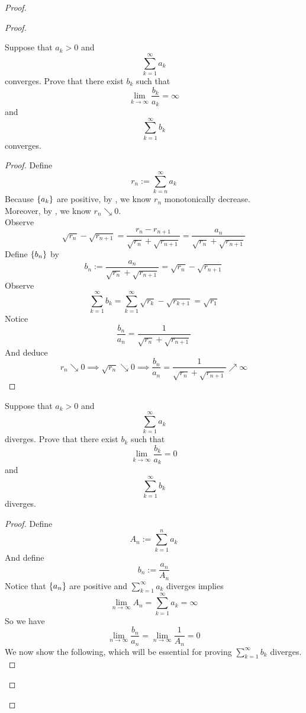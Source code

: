 \documentclass{report}
\begin{document}
\begin{proof}
\begin{proof}
\begin{question}{}{}
Suppose that \( a_k > 0 \) and 
\[
\sum_{k=1}^{\infty} a_k
\]
converges. Prove that there exist \( b_k \) such that 
\[
\lim_{k \to \infty} \frac{b_k}{a_k} = \infty
\]
and 
\[
\sum_{k=1}^{\infty} b_k
\]
converges.
\end{question}
\begin{proof}
Define
\begin{equation}
r_n:=\sum_{k=n}^\infty a_k
\end{equation}
Because $\{ a_k \}$ are positive, by , we know $r_n$ monotonically decrease.\\

Moreover, by , we know $r_n\searrow 0$.\\

Observe
\begin{equation}
\sqrt{r_n} -\sqrt{r_{n+1}}=\frac{r_n-r_{n+1}}{\sqrt{r_n} +\sqrt{r_{n+1}} }=\frac{a_n}{\sqrt{r_n} +\sqrt{r_{n+1}} }
\end{equation}
Define $\{ b_n \}$ by
\begin{equation}
b_n:=\frac{a_n}{\sqrt{r_n} +\sqrt{r_{n+1}} }=\sqrt{r_n} -\sqrt{r_{n+1}} 
\end{equation}
Observe
\begin{equation}
\sum_{k=1}^\infty b_k=\sum_{k=1}^\infty \sqrt{r_k} -\sqrt{r_{k+1}}=\sqrt{r_1}  
\end{equation}
Notice 
\begin{equation}
\frac{b_n}{a_n}=\frac{1}{\sqrt{r_n} +\sqrt{r_{n+1}} }
\end{equation}
And deduce
\begin{equation}
r_n\searrow 0\implies \sqrt{r_n} \searrow 0\implies \frac{b_n}{a_n}=\frac{1}{\sqrt{r_n} +\sqrt{r_{n+1}} }\nearrow \infty
\end{equation}
\end{proof}
\begin{question}{}{}
Suppose that \( a_k > 0 \) and 
\[
\sum_{k=1}^{\infty} a_k
\]
diverges. Prove that there exist \( b_k \) such that 
\[
\lim_{k \to \infty} \frac{b_k}{a_k} = 0
\]
and 
\[
\sum_{k=1}^{\infty} b_k
\]
diverges.
\end{question}
\begin{proof}
Define
\begin{equation}
A_n:= \sum_{k=1}^n a_k
\end{equation}
And define
\begin{equation}
b_n:=\frac{a_n}{A_n}
\end{equation}
Notice that $\{ a_n \}$ are positive and $\sum_{k=1}^\infty a_k$ diverges implies 
\begin{equation}
\lim_{n\to\infty}A_n=\sum_{k=1}^\infty a_k=\infty
\end{equation}
So we have
\begin{equation}
\lim_{n\to\infty}\frac{b_n}{a_n}=\lim_{n\to\infty}\frac{1}{A_n}=0
\end{equation}
We now show the following, which will be essential for proving $\sum_{k=1}^\infty b_k$ diverges.\\


\end{proof}
\end{proof}
\end{proof}
\end{document}
